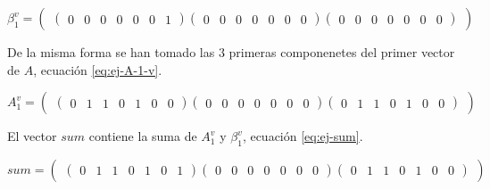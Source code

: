\begin{equation}\label{eq:ej-beta-1-v}
	{\beta^v_1} = 
		\left(\begin{matrix}
			\left(\begin{smallmatrix}0 & 0 & 0 & 0 & 0 & 0 & 1\end{smallmatrix}\right)			
			\left(\begin{smallmatrix}0 & 0 & 0 & 0 & 0 & 0 & 0\end{smallmatrix}\right)
			\left(\begin{smallmatrix}0 & 0 & 0 & 0 & 0 & 0 & 0\end{smallmatrix}\right)
		\end{matrix}\right)
\end{equation}

De la misma forma se han tomado las $3$ primeras componenetes del primer vector de $A$, ecuación \ref{eq:ej-A-1-v}.

\begin{equation}\label{eq:ej-A-1-v}
	{A^v_1} = 
		\left(\begin{matrix}
			\left(\begin{smallmatrix}0 & 1 & 1 & 0 & 1 & 0 & 0\end{smallmatrix}\right)			
			\left(\begin{smallmatrix}0 & 0 & 0 & 0 & 0 & 0 & 0\end{smallmatrix}\right)
			\left(\begin{smallmatrix}0 & 1 & 1 & 0 & 1 & 0 & 0\end{smallmatrix}\right)
		\end{matrix}\right)
\end{equation}

El vector $sum$ contiene la suma de $A^v_1$ y $\beta^v_1$, ecuación \ref{eq:ej-sum}.

\begin{equation}\label{eq:ej-sum}
	{sum} = 
		\left(\begin{matrix}
			\left(\begin{smallmatrix}0 & 1 & 1 & 0 & 1 & 0 & 1\end{smallmatrix}\right)			
			\left(\begin{smallmatrix}0 & 0 & 0 & 0 & 0 & 0 & 0\end{smallmatrix}\right)
			\left(\begin{smallmatrix}0 & 1 & 1 & 0 & 1 & 0 & 0\end{smallmatrix}\right)
		\end{matrix}\right)
\end{equation}

